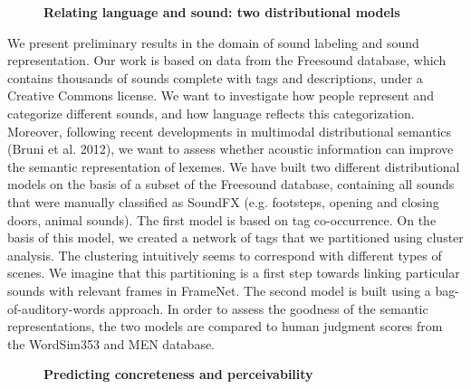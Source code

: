 \documentclass[10pt, a4paper, twopage, headinclude, footinclude, BCOR5mm]{scrartcl}
\begin{document}
\newpage

\begin{figure}[t!]
\centering
\large\textbf{Relating language and sound: two distributional models}
\vspace*{0.5cm}
\end{figure}


        \begin{table}[t!]
    \end{table}

\noindent
We present preliminary results in the domain of sound labeling and sound representation. Our work is based on data from the Freesound database, which contains thousands of sounds complete with tags and descriptions, under a Creative Commons license. We want to investigate how people represent and categorize different sounds, and how language reflects this categorization. Moreover, following recent developments in multimodal distributional semantics (Bruni et al. 2012), we want to assess whether acoustic information can improve the semantic representation of lexemes.  We have built two different distributional models on the basis of a subset of the Freesound database, containing all sounds that were manually classified as SoundFX (e.g. footsteps, opening and closing doors, animal sounds). The first model is based on tag co-occurrence. On the basis of this model, we created a network of tags that we partitioned using cluster analysis. The clustering intuitively seems to correspond with different types of scenes. We imagine that this partitioning is a first step towards linking particular sounds with relevant frames in FrameNet. The second model is built using a bag-of-auditory-words approach. In order to assess the goodness of the semantic representations, the two models are compared to human judgment scores from the WordSim353 and MEN database.


\newpage

\begin{figure}[t!]
\centering
\large\textbf{Predicting concreteness and perceivability}
\vspace*{0.5cm}
\end{figure}
\end{document}
